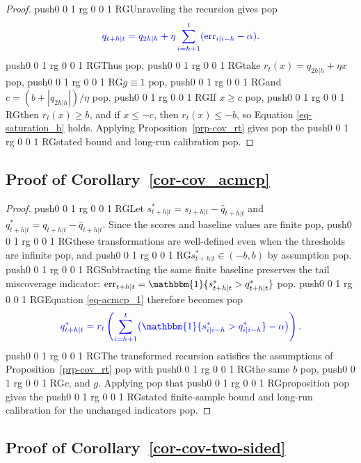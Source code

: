 \documentclass[
  american,
  12pt]{article}
\theoremstyle{plain}
\theoremstyle{plain}
\theoremstyle{remark}
\newcommand{\CPTSadd}[1]{\ifmmode\else\leavevmode\fi\pdfcolorstack 0 push{0 0 1 rg 0 0 1 RG}#1\pdfcolorstack 0 pop}
\begin{document}
\begin{proof}
\CPTSadd{Unraveling the recursion gives} \[
\CPTSadd{q_{t+h|t}=q_{2h|h}+\eta\sum_{i=h+1}^{t}(\mathrm{err}_{i|i-h}-\alpha).}
\] \CPTSadd{Thus}, \CPTSadd{take \(r_t(x)=q_{2h|h}+\eta x\)}, \CPTSadd{\(g\equiv1\)}, \CPTSadd{and
\(c=(b+|q_{2h|h}|)/\eta\)}. \CPTSadd{If \(x\geq c\)}, \CPTSadd{then \(r_t(x)\geq b\), and if
\(x\leq-c\), then \(r_t(x)\leq-b\), so Equation \eqref{eq-saturation_h}
holds. Applying Proposition~\ref{prp-cov_rt} gives} the \CPTSadd{stated bound and
long-run calibration}.
\end{proof}

\subsection{\texorpdfstring{Proof of
Corollary~\ref{cor-cov_acmcp}}{Proof of Corollary~}}\label{sec-proof_cov_acmcp}

\begin{proof}
\CPTSadd{Let \(s_{t+h|t}^{*}=s_{t+h|t}-\hat q_{t+h|t}\) and
\(q_{t+h|t}^{*}=q_{t+h|t}-\hat q_{t+h|t}\). Since the scores and
baseline values are finite}, \CPTSadd{these transformations are well-defined even
when the thresholds are infinite}, and \CPTSadd{\(s_{t+h|t}^{*}\in(-b,b)\) by
assumption}. \CPTSadd{Subtracting the same finite baseline preserves the tail
miscoverage indicator:
\(\mathrm{err}_{t+h|t}=\mathbbm{1}\{s_{t+h|t}^{*}>q_{t+h|t}^{*}\}\)}.
\CPTSadd{Equation \eqref{eq-acmcp_1} therefore becomes} \[
\CPTSadd{q_{t+h|t}^{*}=r_t\left(\sum_{i=h+1}^{t}\bigl(\mathbbm{1}\{s_{i|i-h}^{*}>q_{i|i-h}^{*}\}-\alpha\bigr)\right).}
\] \CPTSadd{The transformed recursion satisfies the assumptions of
Proposition~\ref{prp-cov_rt}} with \CPTSadd{the same \(b\)}, \CPTSadd{\(c\), and \(g\).
Applying} that \CPTSadd{proposition} gives the \CPTSadd{stated finite-sample bound and
long-run calibration for the unchanged indicators}.
\end{proof}

\subsection{\texorpdfstring{Proof of
Corollary~\ref{cor-cov-two-sided}}{Proof of Corollary~}}\label{sec-proof_cov_two_sided}
\end{document}
